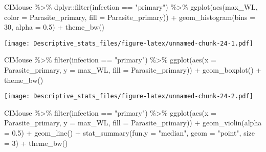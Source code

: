 \documentclass[
]{article}
\newenvironment{Shaded}{\begin{snugshade}}{\end{snugshade}}
\newcommand{\AttributeTok}[1]{\textcolor[rgb]{0.77,0.63,0.00}{#1}}
\newcommand{\DecValTok}[1]{\textcolor[rgb]{0.00,0.00,0.81}{#1}}
\newcommand{\FloatTok}[1]{\textcolor[rgb]{0.00,0.00,0.81}{#1}}
\newcommand{\FunctionTok}[1]{\textcolor[rgb]{0.00,0.00,0.00}{#1}}
\newcommand{\NormalTok}[1]{#1}
\newcommand{\SpecialCharTok}[1]{\textcolor[rgb]{0.00,0.00,0.00}{#1}}
\newcommand{\StringTok}[1]{\textcolor[rgb]{0.31,0.60,0.02}{#1}}
\begin{document}
\begin{Shaded}
\begin{Highlighting}[]
\NormalTok{CIMouse }\SpecialCharTok{\%\textgreater{}\%}
\NormalTok{    dplyr}\SpecialCharTok{::}\FunctionTok{filter}\NormalTok{(infection }\SpecialCharTok{==} \StringTok{"primary"}\NormalTok{) }\SpecialCharTok{\%\textgreater{}\%}
  \FunctionTok{ggplot}\NormalTok{(}\FunctionTok{aes}\NormalTok{(max\_WL, }\AttributeTok{color =}\NormalTok{ Parasite\_primary, }\AttributeTok{fill =}\NormalTok{ Parasite\_primary)) }\SpecialCharTok{+}
  \FunctionTok{geom\_histogram}\NormalTok{(}\AttributeTok{bins =} \DecValTok{30}\NormalTok{, }\AttributeTok{alpha =} \FloatTok{0.5}\NormalTok{)  }\SpecialCharTok{+}
    \FunctionTok{theme\_bw}\NormalTok{()}
\end{Highlighting}
\end{Shaded}

\texttt{[image: Descriptive\_stats\_files/figure-latex/unnamed-chunk-24-1.pdf]}

\begin{Shaded}
\begin{Highlighting}[]
\NormalTok{CIMouse  }\SpecialCharTok{\%\textgreater{}\%}
    \FunctionTok{filter}\NormalTok{(infection }\SpecialCharTok{==} \StringTok{"primary"}\NormalTok{)  }\SpecialCharTok{\%\textgreater{}\%}
  \FunctionTok{ggplot}\NormalTok{(}\FunctionTok{aes}\NormalTok{(}\AttributeTok{x =}\NormalTok{ Parasite\_primary, }\AttributeTok{y =}\NormalTok{ max\_WL, }\AttributeTok{fill =}\NormalTok{ Parasite\_primary)) }\SpecialCharTok{+}
  \FunctionTok{geom\_boxplot}\NormalTok{() }\SpecialCharTok{+}
    \FunctionTok{theme\_bw}\NormalTok{()}
\end{Highlighting}
\end{Shaded}

\texttt{[image: Descriptive\_stats\_files/figure-latex/unnamed-chunk-24-2.pdf]}

\begin{Shaded}
\begin{Highlighting}[]
\NormalTok{CIMouse  }\SpecialCharTok{\%\textgreater{}\%}
    \FunctionTok{filter}\NormalTok{(infection }\SpecialCharTok{==} \StringTok{"primary"}\NormalTok{)  }\SpecialCharTok{\%\textgreater{}\%}
  \FunctionTok{ggplot}\NormalTok{(}\FunctionTok{aes}\NormalTok{(}\AttributeTok{x =}\NormalTok{ Parasite\_primary, }\AttributeTok{y =}\NormalTok{ max\_WL, }\AttributeTok{fill =}\NormalTok{ Parasite\_primary)) }\SpecialCharTok{+}
  \FunctionTok{geom\_violin}\NormalTok{(}\AttributeTok{alpha =} \FloatTok{0.5}\NormalTok{) }\SpecialCharTok{+}
    \FunctionTok{geom\_line}\NormalTok{() }\SpecialCharTok{+}
     \FunctionTok{stat\_summary}\NormalTok{(}\AttributeTok{fun.y =} \StringTok{"median"}\NormalTok{, }\AttributeTok{geom =} \StringTok{"point"}\NormalTok{, }\AttributeTok{size =} \DecValTok{3}\NormalTok{) }\SpecialCharTok{+}
    \FunctionTok{theme\_bw}\NormalTok{() }
\end{Highlighting}
\end{Shaded}
\end{document}
